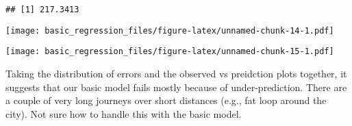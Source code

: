 \documentclass[]{article}
\newenvironment{Shaded}{\begin{snugshade}}{\end{snugshade}}
\newcommand{\DataTypeTok}[1]{\textcolor[rgb]{0.13,0.29,0.53}{#1}}
\newcommand{\DecValTok}[1]{\textcolor[rgb]{0.00,0.00,0.81}{#1}}
\newcommand{\FloatTok}[1]{\textcolor[rgb]{0.00,0.00,0.81}{#1}}
\newcommand{\KeywordTok}[1]{\textcolor[rgb]{0.13,0.29,0.53}{\textbf{#1}}}
\newcommand{\NormalTok}[1]{#1}
\newcommand{\OperatorTok}[1]{\textcolor[rgb]{0.81,0.36,0.00}{\textbf{#1}}}
\newcommand{\StringTok}[1]{\textcolor[rgb]{0.31,0.60,0.02}{#1}}
\begin{document}
\begin{verbatim}
## [1] 217.3413
\end{verbatim}

\begin{Shaded}
\end{Shaded}

\texttt{[image: basic\_regression\_files/figure-latex/unnamed-chunk-14-1.pdf]}

\begin{Shaded}
\end{Shaded}

\texttt{[image: basic\_regression\_files/figure-latex/unnamed-chunk-15-1.pdf]}

Taking the distribution of errors and the observed vs preidction plots
together, it suggests that our basic model fails mostly because of
under-prediction. There are a couple of very long journeys over short
distances (e.g., fat loop around the city). Not sure how to handle this
with the basic model.
\end{document}
